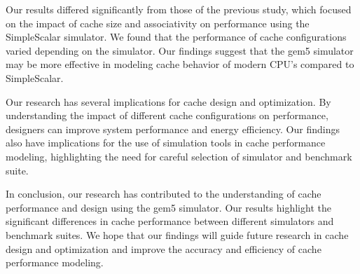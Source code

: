 \documentclass[conference]{IEEEtran}
\begin{document}
Our results differed significantly from those of the previous study, which focused on the impact of cache size and associativity on performance using the SimpleScalar simulator. We found that the performance of cache configurations varied depending on the simulator. Our findings suggest that the gem5 simulator may be more effective in modeling cache behavior of modern CPU's compared to SimpleScalar.

Our research has several implications for cache design and optimization. By understanding the impact of different cache configurations on performance, designers can improve system performance and energy efficiency. Our findings also have implications for the use of simulation tools in cache performance modeling, highlighting the need for careful selection of simulator and benchmark suite.

In conclusion, our research has contributed to the understanding of cache performance and design using the gem5 simulator. Our results highlight the significant differences in cache performance between different simulators and benchmark suites. We hope that our findings will guide future research in cache design and optimization and improve the accuracy and efficiency of cache performance modeling.

\printbibliography
\onecolumn

\appendix
\setcounter{section}{0}
\end{document}

